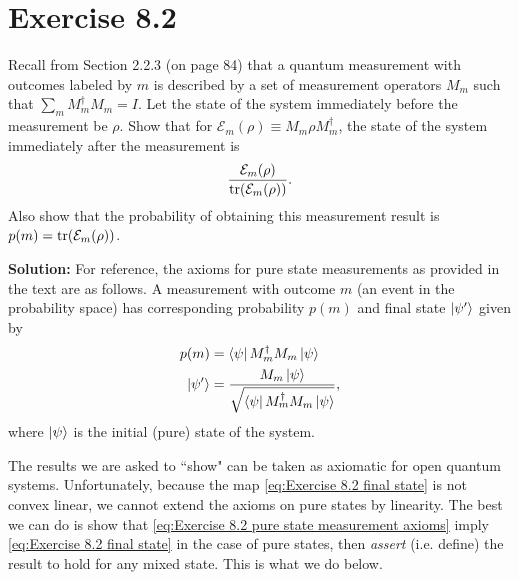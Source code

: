 \documentclass{book}
\newcommand{\mc}[1]{\mathcal{#1}}
\begin{document}
\section*{Exercise 8.2} 
    Recall from Section 2.2.3 (on page 84) that a quantum measurement with outcomes labeled by $m$ is described by a set of measurement operators $M_m$ such that $\sum_m M_m^\dagger M_m = I$. Let the state of the system immediately before the measurement be $\rho$. Show that for $\mc{E}_m(\rho) \equiv M_m \rho M_m^\dagger$, the state of the system immediately after the measurement is
    \begin{align} \label{eq:Exercise 8.2 final state}
        \frac{\mc{E}_m(\rho)}{\tr(\mc{E}_m(\rho))}.
    \end{align}
    Also show that the probability of obtaining this measurement result is $p(m) = \tr(\mc{E}_m(\rho))$.
    
    \textbf{Solution:} For reference, the axioms for pure state measurements as provided in the text are as follows. A measurement with outcome $m$ (an event in the probability space) has corresponding probability $p(m)$ and final state $\ket{\psi'}$ given by
    \begin{align} \label{eq:Exercise 8.2 pure state measurement axioms}
    \begin{aligned} 
        p(m) &= \bra{\psi}M_m^\dagger M_m \ket{\psi} \\
        \ket{\psi'} &= \frac{M_m \ket{\psi}}{\sqrt{\bra{\psi}M_m^\dagger M_m \ket{\psi}}},
    \end{aligned}
    \end{align}
    where $\ket{\psi}$ is the initial (pure) state of the system.
    
    The results we are asked to ``show" can be taken as axiomatic for open quantum systems. Unfortunately, because the map \eqref{eq:Exercise 8.2 final state} is not convex linear, we cannot extend the axioms on pure states by linearity. The best we can do is show that \eqref{eq:Exercise 8.2 pure state measurement axioms} imply \eqref{eq:Exercise 8.2 final state} in the case of pure states, then \emph{assert} (i.e. define) the result to hold for any mixed state. This is what we do below.
    
\end{document}
